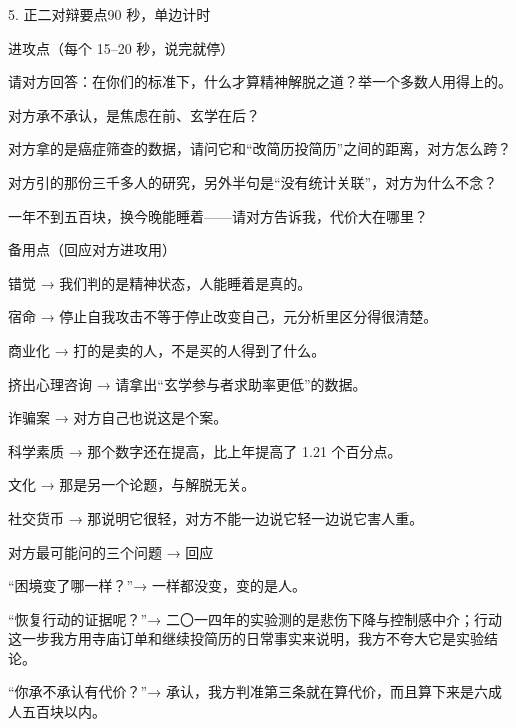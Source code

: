 \documentclass[script,pro]{debate}
\begin{document}
\begin{stage}{5. 正二对辩要点}{90 秒，单边计时}
\begin{points}{进攻点（每个 15–20 秒，说完就停）}
\item 请对方回答：在你们的标准下，什么才算精神解脱之道？举一个多数人用得上的。
\item 对方承不承认，是焦虑在前、玄学在后？
\item 对方拿的是癌症筛查的数据，请问它和“改简历投简历”之间的距离，对方怎么跨？
\item 对方引的那份三千多人的研究，另外半句是“没有统计关联”，对方为什么不念？
\item 一年不到五百块，换今晚能睡着——请对方告诉我，代价大在哪里？
\end{points}
\begin{points}{备用点（回应对方进攻用）}
\item 错觉 → 我们判的是精神状态，人能睡着是真的。
\item 宿命 → 停止自我攻击不等于停止改变自己，元分析里区分得很清楚。
\item 商业化 → 打的是卖的人，不是买的人得到了什么。
\item 挤出心理咨询 → 请拿出“玄学参与者求助率更低”的数据。
\item 诈骗案 → 对方自己也说这是个案。
\item 科学素质 → 那个数字还在提高，比上年提高了 1.21 个百分点。
\item 文化 → 那是另一个论题，与解脱无关。
\item 社交货币 → 那说明它很轻，对方不能一边说它轻一边说它害人重。
\end{points}
\begin{points}{对方最可能问的三个问题 → 回应}
\item “困境变了哪一样？”→ 一样都没变，变的是人。
\item “恢复行动的证据呢？”→ 二〇一四年的实验测的是悲伤下降与控制感中介；行动这一步我方用寺庙订单和继续投简历的日常事实来说明，我方不夸大它是实验结论。
\item “你承不承认有代价？”→ 承认，我方判准第三条就在算代价，而且算下来是六成人五百块以内。
\end{points}
\end{stage}
\end{document}
